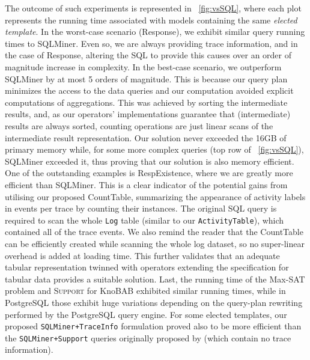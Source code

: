 


The outcome of such experiments is represented in \figurename~\ref{fig:vsSQL}, where each plot represents the running time associated with models containing the same \textit{elected template}. In the worst-case scenario (\textsf{Response}), we exhibit similar query running times to SQLMiner. Even so, we are always providing trace information, and in the case of \textsf{Response}, altering the SQL to provide this causes over an order of magnitude increase in complexity. In the best-case scenario, we outperform SQLMiner by at most 5 orders of magnitude. This is because our query plan minimizes the access to the data queries and our computation avoided explicit computations of aggregations. This was achieved by sorting the intermediate results, and, as our operators' implementations guarantee that (intermediate) results are always sorted, counting operations are just linear scans of the intermediate result representation. Our solution never exceeded the 16GB of primary memory while, for some more complex queries (top row of \figurename~\ref{fig:vsSQL}), SQLMiner exceeded it, thus proving that our solution is also memory efficient. One of the outstanding examples is \textsf{RespExistence}, where we are greatly more efficient than SQLMiner. This is a clear indicator of the potential gains from utilising our proposed \textsf{CountTable}, summarizing the appearance of activity labels in events per trace by counting their instances. The original SQL query is required to scan the whole \texttt{Log} table (similar to our \texttt{ActivityTable}), which contained all of the trace events. We also remind the reader that the \textsf{CountTable} can be efficiently created while scanning the whole log dataset, so no super-linear overhead is added at loading time. This further validates that an adequate tabular representation twinned with \xLTLf operators extending the \LTLf specification for tabular data provides a suitable solution. Last, the running time of the Max-SAT problem and \textsc{Support} for KnoBAB exhibited similar running times, while in PostgreSQL those exhibit huge variations depending on the query-plan rewriting performed by the PostgreSQL query engine. For some elected templates, our proposed \texttt{SQLMiner+TraceInfo} formulation proved also to be more efficient than the \texttt{SQLMiner+Support} queries originally proposed by \cite{Schonig15} (which contain no trace information).




